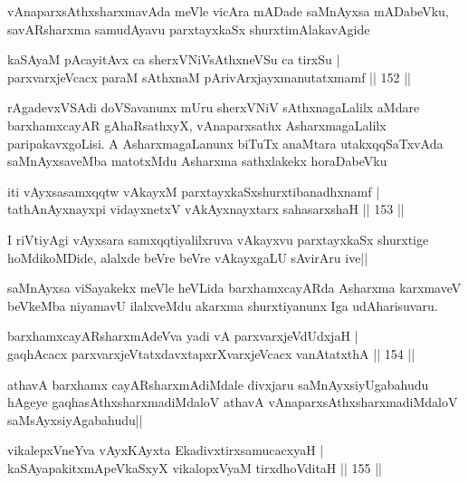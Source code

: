\begin{artha}
vAnaparxsAthxsharxmavAda meVle vicAra mADade saMnAyxsa mADabeVku, savARsharxma samudAyavu parxtayxkaSx shurxtimAlakavAgide
\end{artha}


\begin{shl}
kaSAyaM pAcayitAvx ca sherxVNiVsAthxneVSu ca tirxSu |\\
parxvarxjeVcacx paraM sAthxnaM pArivArxjayxmanutatxmamf \hfill || 152 ||
\end{shl}

\begin{artha}
rAgadevxVSAdi doVSavanunx mUru sherxVNiV sAthxnagaLalilx aMdare barxhamxcayAR gAhaRsathxyX, vAnaparxsathx AsharxmagaLalilx paripakavxgoLisi. A AsharxmagaLanunx biTuTx anaMtara utakxqqSaTxvAda saMnAyxsaveMba matotxMdu Asharxma sathxlakekx horaDabeVku
\end{artha}

\begin{shl}
iti vAyxsasamxqqtw vAkayxM parxtayxkaSxshurxtibanadhxnamf |\\
tathA\s nAyxnayxpi vidayxnetxV vAkAyxnayxtarx sahasarxshaH \hfill || 153 ||
\end{shl}

\begin{artha}%
I riVtiyAgi vAyxsara samxqqtiyalilxruva vAkayxvu parxtayxkaSx shurxtige hoMdikoMDide, alalxde beVre beVre vAkayxgaLU sAvirAru ive||

saMnAyxsa viSayakekx meVle heVLida barxhamxcayARda Asharxma karxmaveV beVkeMba niyamavU ilalxveMdu akarxma shurxtiyanunx Iga udAharisuvaru.
\end{artha}

\begin{shl}
barxhamxcayARsharxmAdeVva yadi vA parxvarxjeVdUdxjaH |\\
gaqhAcacx parxvarxjeVtatxdavxtapxrXvarxjeVcacx vanAtatxthA \hfill || 154 ||
\end{shl}

\begin{artha}
athavA barxhamx cayARsharxmAdiMdale divxjaru saMnAyxsiyUgabahudu hAgeye gaqhasAthxsharxmadiMdaloV athavA vAnaparxsAthxsharxmadiMdaloV saMsAyxsiyAgabahudu||
\end{artha}

\begin{shl}
vikalepxVneYva vAyxKAyxta EkadivxtirxsamucacxyaH |\\
kaSAyapakitxmApeVkaSxyX vikalopxV\s yaM tirxdhoVditaH \hfill || 155 ||
\end{shl}


